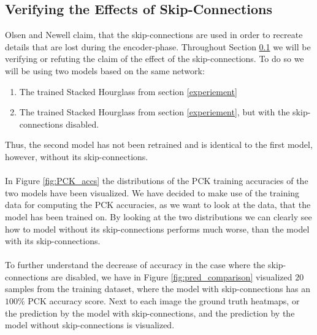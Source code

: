 \documentclass[./main.tex]{subfiles}
\begin{document}
\subsection{Verifying the Effects of Skip-Connections}\label{subsec:verifying_skip_cons}
Olsen \cite{Camilla} and Newell \cite{Newell} claim, that the skip-connections are used in order to recreate details that are lost during the encoder-phase. Throughout Section \ref{subsec:verifying_skip_cons} we will be verifying or refuting the claim of the effect of the skip-connections. To do so we will be using two models based on the same network:
\begin{enumerate}
    \item The trained Stacked Hourglass from section \ref{experiement}
    \item The trained Stacked Hourglass from section \ref{experiement}, but with the skip-connections disabled.
\end{enumerate}
Thus, the second model has not been retrained and is identical to the first model, however, without its skip-connections.
\\
\\
In Figure \ref{fig:PCK_accs} the distributions of the PCK training accuracies of the two models have been visualized. We have decided to make use of the training data for computing the PCK accuracies, as we want to look at the data, that the model has been trained on. By looking at the two distributions we can clearly see how to model without its skip-connections performs much worse, than the model with its skip-connections.
\\
\\
To further understand the decrease of accuracy in the case where the skip-connections are disabled, we have in Figure \ref{fig:pred_comparison} visualized $20$ samples from the training dataset, where the model with skip-connections has an $100\%$ PCK accuracy score. Next to each image the ground truth heatmaps, or the prediction by the model with skip-connections, and the prediction by the model without skip-connections is visualized.
\\
\end{document}

